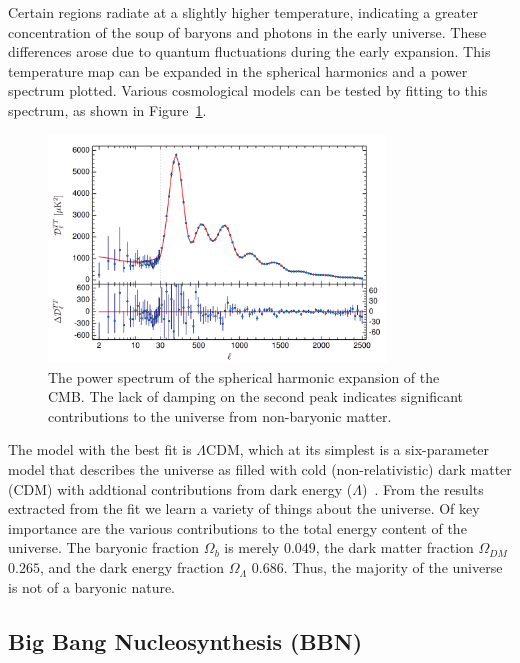 Certain regions radiate at a slightly higher temperature, indicating a greater concentration of the soup of baryons and photons in the early universe. These differences arose due to quantum fluctuations during the early expansion. This temperature map can be expanded in the spherical harmonics and a power spectrum plotted. Various cosmological models can be tested by fitting to this spectrum, as shown in Figure~\ref{fig:cmb_ps}.

\begin{figure}[htb]
\centering
    \includegraphics[width=0.8\textwidth]{figures/dm/planck2015_cmb}
    \caption{The power spectrum of the spherical harmonic expansion of the CMB. The lack of damping on the second peak indicates significant contributions to the universe from non-baryonic matter.}\label{fig:cmb_ps}
\end{figure}

The model with the best fit is $\Lambda$CDM, which at its simplest is a six-parameter model that describes the universe as filled with cold (non-relativistic) dark matter (CDM) with addtional contributions from dark energy ($\Lambda$)~\cite{Riess:1998cb}. From the results extracted from the fit we learn a variety of things about the universe. Of key importance are the various contributions to the total energy content of the universe. The baryonic fraction $\Omega_b$ is merely $0.049$, the dark matter fraction $\Omega_{DM}$ $0.265$, and the dark energy fraction $\Omega_{\Lambda}$ $0.686$. Thus, the majority of the universe is not of a baryonic nature.

\subsection{Big Bang Nucleosynthesis (BBN)}

